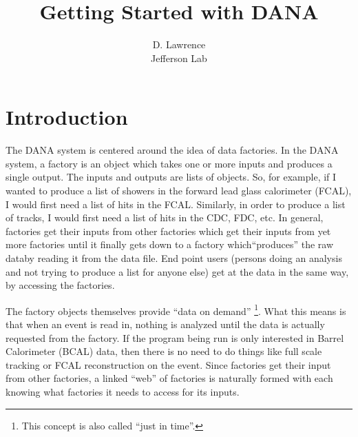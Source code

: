 \documentclass[12pt]{article}
\author{D. Lawrence \\ Jefferson Lab}
\title{Getting Started with DANA}
\begin{document}
\maketitle



\newpage
\tableofcontents
\newpage

\section{Introduction}
The DANA system is centered around the idea of data factories. In the
DANA system, a factory is an object which takes one or more inputs
and produces a single output. The inputs and outputs are lists of objects.
So, for example, if I wanted to produce a list of showers in the forward
lead glass calorimeter (FCAL), I would first need a list of hits in the
FCAL. Similarly, in order to produce a list of tracks, I would first
need a list of hits in the CDC, FDC, etc. In general, factories get their
inputs from other factories which get their inputs from yet more factories 
until it finally gets down to a factory which``produces'' the raw
databy reading it from the data file. End point users (persons doing an analysis
and not trying to produce a list for anyone else) get at the data in the
same way, by accessing the factories.

The factory objects themselves provide ``data on demand''
\footnote{This concept is also called ``just in time''.}. What this
means is that when an event is read in, nothing is analyzed until the
data is actually requested from the factory. If the program being run
is only interested in Barrel Calorimeter (BCAL) data, then there is
no need to do things like full scale tracking or FCAL reconstruction
on the event.
Since factories get their input from other factories, a linked ``web''
of factories is naturally formed with each knowing what factories it
needs to access for its inputs.
\end{document}
